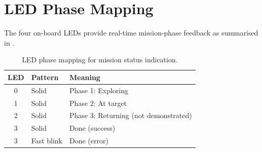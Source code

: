 \documentclass[runningheads]{llncs}
\begin{document}
\section*{LED Phase Mapping}

The four on-board LEDs provide real-time mission-phase feedback as summarised in .

\begin{table}[h]
\centering
\caption{LED phase mapping for mission status indication.}
\label{tab:leds}
\begin{tabular}{@{}cll@{}}
\toprule
\textbf{LED} & \textbf{Pattern} & \textbf{Meaning} \\
\midrule
0 & Solid & Phase 1: Exploring \\
1 & Solid & Phase 2: At target \\
2 & Solid & Phase 3: Returning (not demonstrated) \\
3 & Solid & Done (success) \\
3 & Fast blink & Done (error) \\
\bottomrule
\end{tabular}
\end{table}



\end{document}
